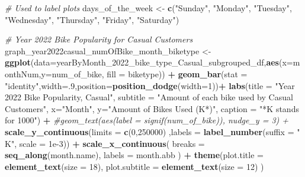 \documentclass[
]{article}
\newenvironment{Shaded}{\begin{snugshade}}{\end{snugshade}}
\newcommand{\AttributeTok}[1]{\textcolor[rgb]{0.13,0.29,0.53}{#1}}
\newcommand{\CommentTok}[1]{\textcolor[rgb]{0.56,0.35,0.01}{\textit{#1}}}
\newcommand{\DecValTok}[1]{\textcolor[rgb]{0.00,0.00,0.81}{#1}}
\newcommand{\FloatTok}[1]{\textcolor[rgb]{0.00,0.00,0.81}{#1}}
\newcommand{\FunctionTok}[1]{\textcolor[rgb]{0.13,0.29,0.53}{\textbf{#1}}}
\newcommand{\NormalTok}[1]{#1}
\newcommand{\OtherTok}[1]{\textcolor[rgb]{0.56,0.35,0.01}{#1}}
\newcommand{\SpecialCharTok}[1]{\textcolor[rgb]{0.81,0.36,0.00}{\textbf{#1}}}
\newcommand{\StringTok}[1]{\textcolor[rgb]{0.31,0.60,0.02}{#1}}
\begin{document}
\begin{Shaded}
\begin{Highlighting}[]
\CommentTok{\# Used to label plots}
\NormalTok{days\_of\_the\_week }\OtherTok{\textless{}{-}} \FunctionTok{c}\NormalTok{(}\StringTok{"Sunday"}\NormalTok{, }\StringTok{"Monday"}\NormalTok{, }\StringTok{"Tuesday"}\NormalTok{, }\StringTok{"Wednesday"}\NormalTok{, }
                      \StringTok{"Thursday"}\NormalTok{, }\StringTok{"Friday"}\NormalTok{, }\StringTok{"Saturday"}\NormalTok{)}

\CommentTok{\# Year 2022 Bike Popularity for Casual Customers}
\NormalTok{graph\_year2022casual\_numOfBike\_month\_biketype }\OtherTok{\textless{}{-}} \FunctionTok{ggplot}\NormalTok{(}\AttributeTok{data=}\NormalTok{yearByMonth\_2022\_bike\_type\_Casual\_subgrouped\_df,}\FunctionTok{aes}\NormalTok{(}\AttributeTok{x=}\NormalTok{monthNum,}\AttributeTok{y=}\NormalTok{num\_of\_bike, }\AttributeTok{fill =}\NormalTok{ biketype)) }\SpecialCharTok{+}
  \FunctionTok{geom\_bar}\NormalTok{(}\AttributeTok{stat =} \StringTok{"identity"}\NormalTok{,}\AttributeTok{width=}\NormalTok{.}\DecValTok{9}\NormalTok{,}\AttributeTok{position=}\FunctionTok{position\_dodge}\NormalTok{(}\AttributeTok{width=}\DecValTok{1}\NormalTok{))}\SpecialCharTok{+}
  \FunctionTok{labs}\NormalTok{(}\AttributeTok{title =} \StringTok{"Year 2022 Bike Popularity, Casual"}\NormalTok{,}
       \AttributeTok{subtitle =} \StringTok{"Amount of each bike used by Casual Customers"}\NormalTok{,}
       \AttributeTok{x=}\StringTok{"Month"}\NormalTok{,}
       \AttributeTok{y=}\StringTok{"Amount of Bikes Used (K*)"}\NormalTok{,}
       \AttributeTok{caption =} \StringTok{"*K stands for 1000"}\NormalTok{) }\SpecialCharTok{+}
  \CommentTok{\#geom\_text(aes(label = signif(num\_of\_bike)), nudge\_y = 3) +}
  \FunctionTok{scale\_y\_continuous}\NormalTok{(}\AttributeTok{limits =} \FunctionTok{c}\NormalTok{(}\DecValTok{0}\NormalTok{,}\DecValTok{250000}\NormalTok{) ,}\AttributeTok{labels =} \FunctionTok{label\_number}\NormalTok{(}\AttributeTok{suffix =} \StringTok{" K"}\NormalTok{, }\AttributeTok{scale =} \FloatTok{1e{-}3}\NormalTok{)) }\SpecialCharTok{+}
  \FunctionTok{scale\_x\_continuous}\NormalTok{(}
    \AttributeTok{breaks =} \FunctionTok{seq\_along}\NormalTok{(month.name), }
    \AttributeTok{labels =}\NormalTok{ month.abb}
\NormalTok{  )  }\SpecialCharTok{+}
  \FunctionTok{theme}\NormalTok{(}\AttributeTok{plot.title =} \FunctionTok{element\_text}\NormalTok{(}\AttributeTok{size =} \DecValTok{18}\NormalTok{),}
        \AttributeTok{plot.subtitle =} \FunctionTok{element\_text}\NormalTok{(}\AttributeTok{size =} \DecValTok{12}\NormalTok{)}
\NormalTok{  )}


\end{Highlighting}
\end{Shaded}
\end{document}
